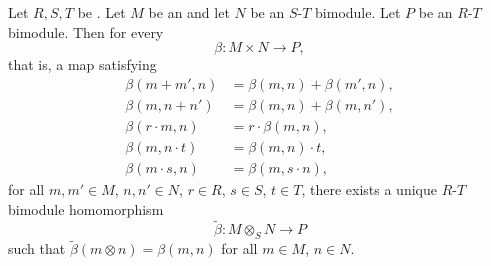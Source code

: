 \begin{proposition} \label{proposition:universal_property_of_the_tensor_product_of_bimodules}
Let $R,S,T$ be . Let $M$ be an  and let $N$ be an $S$-$T$ bimodule. Let $P$ be an $R$-$T$ bimodule. Then for every 
$$ \beta : M \times N \to P, $$
that is, a map satisfying
\begin{align*}
\beta(m+m',n) &= \beta(m,n) + \beta(m',n), \\
\beta(m,n+n') &= \beta(m,n) + \beta(m,n'), \\
\beta(r \cdot m, n) &= r \cdot \beta(m,n), \\
\beta(m,n\cdot t) &= \beta(m,n)\cdot t, \\
\beta(m \cdot s, n) &= \beta(m,s \cdot n),
\end{align*}
for all $m,m' \in M$, $n,n' \in N$, $r \in R$, $s \in S$, $t \in T$, there exists a unique $R$-$T$ bimodule homomorphism
$$ \widetilde{\beta} : M \otimes_S N \to P $$
such that $\widetilde{\beta}(m \otimes n) = \beta(m,n)$ for all $m \in M$, $n \in N$.
\end{proposition}


